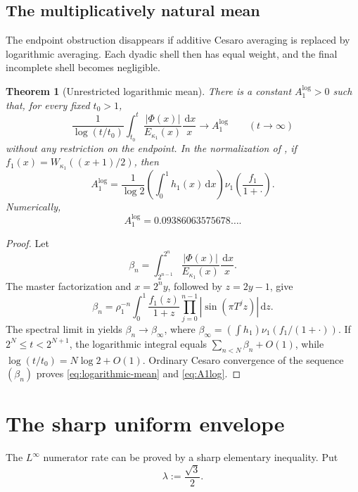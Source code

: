 \documentclass[11pt,oneside]{article}
\newtheorem{theorem}{Theorem}[section]
\theoremstyle{definition}
\theoremstyle{remark}
\newcommand{\dd}{\,\mathrm d}
\begin{document}
\subsection{The multiplicatively natural mean}

The endpoint obstruction disappears if additive Cesaro averaging is replaced by logarithmic
averaging.  Each dyadic shell then has equal weight, and the final incomplete shell becomes
negligible.

\begin{theorem}[Unrestricted logarithmic mean]
\label{thm:logarithmic-mean}
There is a constant $A_1^{\log}>0$ such that, for every fixed $t_0>1$,
\begin{equation}
 \frac1{\log(t/t_0)}\int_{t_0}^t
 \frac{|\Phi(x)|}{E_{\kappa_1}(x)}\frac{\dd x}{x}
 \longrightarrow A_1^{\log}
 \qquad(t\to\infty)
 \label{eq:logarithmic-mean}
\end{equation}
without any restriction on the endpoint.  In the normalization of
, if
$f_1(x)=W_{\kappa_1}((x+1)/2)$, then
\begin{equation}
 A_1^{\log}=\frac1{\log2}
 \left(\int_0^1h_1(x)\dd x\right)
 \nu_1\!\left(\frac{f_1}{1+\cdot}\right).
 \label{eq:A1log}
\end{equation}
Numerically,
\begin{equation}
 A_1^{\log}=0.09386063575678\ldots .
 \label{eq:A1log-numeric}
\end{equation}
\end{theorem}

\begin{proof}
Let
\[
 \beta_n=\int_{2^{n-1}}^{2^n}
 \frac{|\Phi(x)|}{E_{\kappa_1}(x)}\frac{\dd x}{x}.
\]
The master factorization and $x=2^ny$, followed by $z=2y-1$, give
\[
 \beta_n=\rho_1^{-n}\int_0^1
 \frac{f_1(z)}{1+z}\prod_{j=0}^{n-1}|\sin(\pi T^jz)|\dd z.
\]
The spectral limit in  yields $\beta_n\to\beta_\infty$, where
$\beta_\infty=(\int h_1)\nu_1(f_1/(1+\cdot))$.  If
$2^N\le t<2^{N+1}$, the logarithmic integral equals
$\sum_{n<N}\beta_n+O(1)$, while $\log(t/t_0)=N\log2+O(1)$.  Ordinary Cesaro convergence of
the sequence $(\beta_n)$ proves \eqref{eq:logarithmic-mean} and
\eqref{eq:A1log}.
\end{proof}

\section{The sharp uniform envelope}
\label{sec:uniform}

The $L^\infty$ numerator rate can be proved by a sharp elementary inequality.  Put
\begin{equation}
 \lambda:=\frac{\sqrt3}{2}.
 \label{eq:lambda}
\end{equation}
\end{document}

